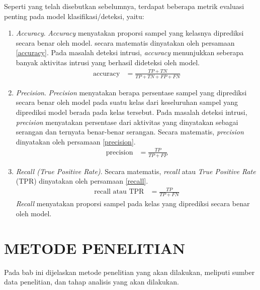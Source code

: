 \documentclass[a4paper,12pt]{report}
\begin{document}
Seperti yang telah disebutkan sebelumnya, terdapat beberapa metrik evaluasi penting pada model klasifikasi/deteksi, yaitu:
\begin{enumerate}
	\item \textit{Accuracy}. \textit{Accuracy} menyatakan proporsi sampel yang kelasnya diprediksi secara benar oleh model. secara matematis dinyatakan oleh persamaan \ref{accuracy}. Pada masalah deteksi intrusi, \textit{accuracy} menunjukkan seberapa banyak aktivitas intrusi yang berhasil dideteksi oleh model.
	\begin{equation}
		\begin{split}
			\text{accuracy} &= \frac{TP + TN}{TP + TN + FP + FN} 
		\end{split}
		\label{accuracy}
	\end{equation}
	\item \textit{Precision}. \textit{Precision} menyatakan berapa persentase sampel yang diprediksi secara benar oleh model pada suatu kelas dari keseluruhan sampel yang diprediksi model berada pada kelas tersebut. Pada masalah deteksi intrusi, \textit{precision} menyatakan persentase dari aktivitas yang dinyatakan sebagai serangan dan ternyata benar-benar serangan. Secara matematis, \textit{precision} dinyatakan oleh persamaan \ref{precision}.
	\begin{equation}
		\begin{split}
			\text{precision} &= \frac{TP}{TP + FP} 
		\end{split}
		\label{precision}
	\end{equation}
	
	\item \textit{Recall (True Positive Rate)}. Secara matematis, \textit{recall} atau \textit{True Positive Rate} (TPR) dinyatakan oleh persamaan \ref{recall}.
	\begin{equation}
		\begin{split}
			\text{recall atau TPR} &= \frac{TP}{TP + FN} 
		\end{split}
		\label{recall}
	\end{equation}
	\textit{Recall} menyatakan proporsi sampel pada kelas yang diprediksi secara benar oleh model.
\end{enumerate}

\chapter{METODE PENELITIAN}
Pada bab ini dijelaskan metode penelitian yang akan dilakukan, meliputi sumber data penelitian, dan tahap analisis yang akan dilakukan.
\end{document}
